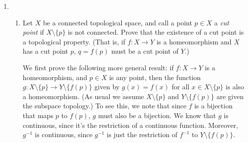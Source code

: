 \documentclass[letterpaper,12pt]{article}
\begin{document}
\begin{enumerate}
Let $p:X\to CX$ denote the quotient map, and let $a\in CX$ denote the apex of the cone; that is, such that $p^{-1}(a)=X\times\{1\}$. It suffices to show that for any point $y\in CX$, there exists a path $\gamma:[0,1]\to CX$ from $y$ to $a$, since for any two points $y_1,y_2\in CX$ with paths $\gamma_1,\gamma_2$ from $y_1,y_2$ to $a$, respectively, the path $\gamma_1\star\gamma_2^{-1}$ given by
\[
\gamma_1\star\gamma_2^{-1}(s) = \begin{cases} \gamma_1(s) & \text{ if } 0\leq s\leq 1/2\\ \gamma_2(2-2s) & \text{ if } 1/2\leq s\leq 1\end{cases}
\]
is a path from $y_1$ to $y_2$. So, let $y\in CX$. If $y=a$, we can take the constant path. If $y\neq a$, then $y=p(x,t)$ for some $x\in X$ and $t\in [0,1)$. Let $\alpha:[0,1]\to X\times [0,1]$ be the path given by
\[
\alpha(s) = (x, t+s-st).
\]
Then $\alpha$ is clearly continuous, since the map $f:[0,1]\to [0,1]$ given by $f(s)=t+(1-t)s$ is continuous, and $\alpha$ is the product of $f$ and a constant map. Moreover, $\alpha(0)=(x,t)$ and $\alpha(1)=(x,1)$, so $\alpha$ is a path in $X\times [0,1]$ from $(x,t)$ to $(x,1)$. It follows that the composition $\gamma = p\circ \alpha:[0,1]\to CX$ is a path from $y$ to $a$.

\bigskip

\item \begin{enumerate}
\item Let $X$ be a connected topological space, and call a point $p\in X$ a {\em cut point} if $X\setminus \{p\}$ is not connected. Prove that the existence of a cut point is a topological property. (That is, if $f:X\to Y$ is a homeomorphism and $X$ has a cut point $p$, $q=f(p)$ must be a cut point of $Y$.)

\bigskip

We first prove the following more general result: if $f:X\to Y$ is a homeomorphism, and $p\in X$ is any point, then the function $g:X\setminus\{p\}\to Y\setminus\{f(p)\}$ given by $g(x)=f(x)$ for all $x\in X\setminus \{p\}$ is also a homeomorphism. (As usual we assume $X\setminus\{p\}$ and $Y\setminus \{f(p)\}$ are given the subspace topology.) To see this, we note that since $f$ is a bijection that maps $p$ to $f(p)$, $g$ must also be a bijection. We know that $g$ is continuous, since it's the restriction of a continuous function. Moreover, $g^{-1}$ is continuous, since $g^{-1}$ is just the restriction of $f^{-1}$ to $Y\setminus\{f(p)\}$.


\end{enumerate}
\end{enumerate}
\end{document}
